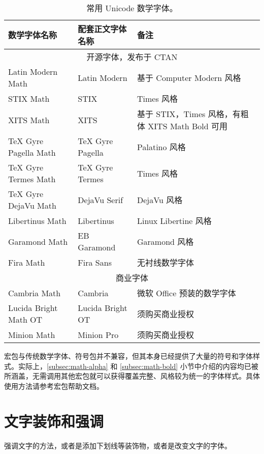 \begin{table}[htp]
\centering\small
\caption{常用 Unicode 数学字体。}
\label{tbl:uni-math-fonts}
\begin{tabular}{llp{20em}}
\hline
\textbf{数学字体名称} & \textbf{配套正文字体名称} & \textbf{备注} \\
\hline
\multicolumn{3}{c}{开源字体，发布于 CTAN} \\
\hline
Latin Modern Math     & Latin Modern     & 基于 Computer Modern 风格 \\
STIX Math             & STIX             & Times 风格 \\
XITS Math             & XITS             & 基于 STIX，Times 风格，有粗体 XITS Math Bold 可用 \\
TeX Gyre Pagella Math & TeX Gyre Pagella & Palatino 风格 \\
TeX Gyre Termes Math  & TeX Gyre Termes  & Times 风格 \\
TeX Gyre DejaVu Math  & DejaVu Serif     & DejaVu 风格 \\
Libertinus Math       & Libertinus       & Linux Libertine 风格 \\
Garamond Math         & EB Garamond      & Garamond 风格 \\
Fira Math             & Fira Sans        & 无衬线数学字体 \\
\hline
\multicolumn{3}{c}{商业字体} \\
\hline
Cambria Math          & Cambria          & 微软 Office 预装的数学字体 \\
Lucida Bright Math OT & Lucida Bright OT & 须购买商业授权 \\
Minion Math           & Minion Pro       & 须购买商业授权 \\
\hline
\end{tabular}
\end{table}

 宏包与传统数学字体、符号包并不兼容，但其本身已经提供了大量的符号和字体样式。实际上，\ref{subsec:math-alpha} 和 \ref{subsec:math-bold} 小节中介绍的内容均已被  所涵盖，无需调用其他宏包就可以获得覆盖完整、风格较为统一的字体样式。具体使用方法请参考宏包帮助文档。

\section{文字装饰和强调}\label{sec:emphasize}

强调文字的方法，或者是添加下划线等装饰物，或者是改变文字的字体。

